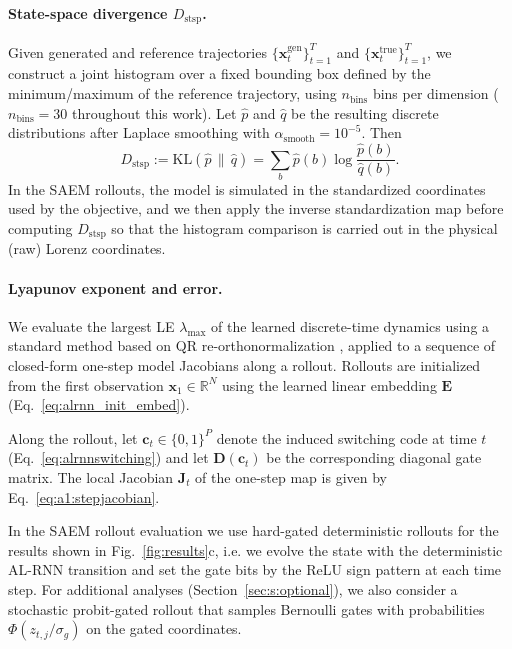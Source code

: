 \documentclass[twoside]{article}
\theoremstyle{plain}
\theoremstyle{definition}
\theoremstyle{remark}
\begin{document}
\paragraph{State-space divergence $D_{\mathrm{stsp}}$.}
Given generated and reference trajectories $\{\bm{x}_t^{\mathrm{gen}}\}_{t=1}^T$ and $\{\bm{x}_t^{\mathrm{true}}\}_{t=1}^T$, we construct a joint histogram over a fixed bounding box defined by the minimum/maximum of the reference trajectory, using $n_{\mathrm{bins}}$ bins per dimension ($n_{\mathrm{bins}}=30$ throughout this work).
Let $\hat p$ and $\hat q$ be the resulting discrete distributions after Laplace smoothing with $\alpha_{\mathrm{smooth}}=10^{-5}$.
Then
\begin{equation}
D_{\mathrm{stsp}} := \mathrm{KL}(\hat p\,\|\,\hat q) = \sum_{b} \hat p(b)\log\frac{\hat p(b)}{\hat q(b)}.
\end{equation}
In the SAEM rollouts, the model is simulated in the standardized coordinates used by the objective, and we then apply the inverse standardization map before computing $D_{\mathrm{stsp}}$ so that the histogram comparison is carried out in the physical (raw) Lorenz coordinates.

\paragraph{Lyapunov exponent and error.}
We evaluate the largest LE $\lambda_{\mathrm{max}}$ of the learned discrete-time dynamics using a standard method based on QR re-orthonormalization \citep{benettin1980lyapunov}, applied to a sequence of closed-form one-step model Jacobians along a rollout. Rollouts are initialized from the first observation $\bm{x}_1\in\mathbb{R}^N$ using the learned linear embedding $\bm E$ (Eq.~\eqref{eq:alrnn_init_embed}).

Along the rollout, let $\bm c_t\in\{0,1\}^P$ denote the induced switching code at time $t$ (Eq.~\eqref{eq:alrnnswitching}) and let $\bm{D}(\bm{c}_t)$ be the corresponding diagonal gate matrix. The local Jacobian $\bm{J}_t$ of the one-step map is given by Eq.~\eqref{eq:a1:stepjacobian}.

In the SAEM rollout evaluation we use hard-gated deterministic rollouts for the results shown in Fig.~\ref{fig:results}c, i.e. we evolve the state with the deterministic AL-RNN transition and set the gate bits by the ReLU sign pattern at each time step.
For additional analyses (Section~\ref{sec:s:optional}), we also consider a stochastic probit-gated rollout that samples Bernoulli gates with probabilities $\Phi(z_{t,j}/\sigma_g)$ on the gated coordinates.
\end{document}
